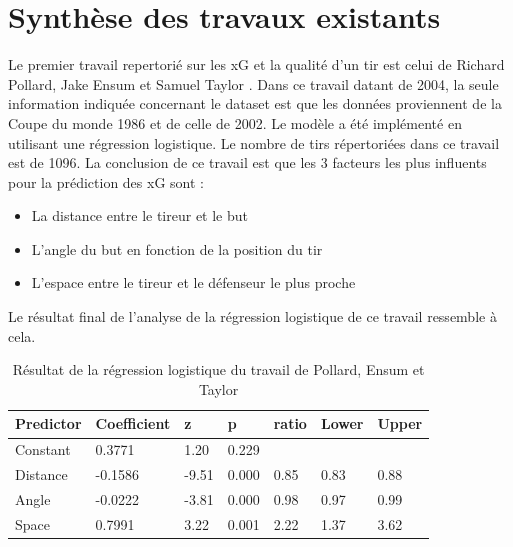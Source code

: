 \documentclass[12pt]{article}
\begin{document}
\section{Synthèse des travaux existants}
\label{sec:synthese}
\noindent Le premier travail repertorié sur les xG et la qualité d'un tir est celui de Richard Pollard, Jake Ensum et Samuel Taylor \cite{pollardEstimatingProbabilityShot2004}.
Dans ce travail datant de 2004, la seule information indiquée concernant le dataset est que les données proviennent de la Coupe du monde 1986 et de celle de 2002.
Le modèle a été implémenté en utilisant une régression logistique.
Le nombre de tirs répertoriées dans ce travail est de 1096.
La conclusion de ce travail est que les 3 facteurs les plus influents pour la prédiction des xG sont :
\begin{itemize}
    \item La distance entre le tireur et le but
    \item L'angle du but en fonction de la position du tir
    \item L'espace entre le tireur et le défenseur le plus proche
\end{itemize}
Le résultat final de l'analyse de la régression logistique de ce travail ressemble à cela.
\begin{table}[htp]
    \centering
    \begin{tabular}{|l|l|l|l|l|l|l|}
        \hline
        \textbf{Predictor} & \textbf{Coefficient} & \textbf{z} & \textbf{p} & \textbf{ratio} & \textbf{Lower} & \textbf{Upper} \\ \hline
        Constant           & 0.3771               & 1.20       & 0.229      &                &                &                \\ \hline
        Distance           & -0.1586              & -9.51      & 0.000      & 0.85           & 0.83           & 0.88           \\ \hline
        Angle              & -0.0222              & -3.81      & 0.000      & 0.98           & 0.97           & 0.99           \\ \hline
        Space              & 0.7991               & 3.22       & 0.001      & 2.22           & 1.37           & 3.62           \\ \hline
    \end{tabular}
    \caption{Résultat de la régression logistique du travail de Pollard, Ensum et Taylor}
\end{table}
\end{document}
